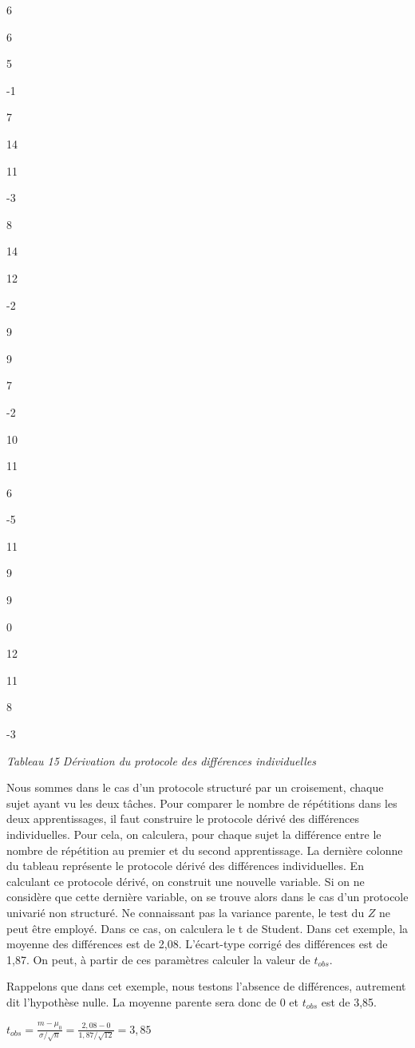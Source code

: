 \documentclass[]{book}
\theoremstyle{definition}
\theoremstyle{definition}
\theoremstyle{definition}
\theoremstyle{remark}
\begin{document}
6

6

5

-1

7

14

11

-3

8

14

12

-2

9

9

7

-2

10

11

6

-5

11

9

9

0

12

11

8

-3

\emph{Tableau 15 Dérivation du protocole des différences individuelles}

Nous sommes dans le cas d'un protocole structuré par un croisement,
chaque sujet ayant vu les deux tâches. Pour comparer le nombre de
répétitions dans les deux apprentissages, il faut construire le
protocole dérivé des différences individuelles. Pour cela, on calculera,
pour chaque sujet la différence entre le nombre de répétition au premier
et du second apprentissage. La dernière colonne du tableau représente le
protocole dérivé des différences individuelles. En calculant ce
protocole dérivé, on construit une nouvelle variable. Si on ne considère
que cette dernière variable, on se trouve alors dans le cas d'un
protocole univarié non structuré. Ne connaissant pas la variance
parente, le test du \(Z\) ne peut être employé. Dans ce cas, on
calculera le t de Student. Dans cet exemple, la moyenne des différences
est de 2,08. L'écart-type corrigé des différences est de 1,87. On peut,
à partir de ces paramètres calculer la valeur de \(t_{obs}\).

Rappelons que dans cet exemple, nous testons l'absence de différences,
autrement dit l'hypothèse nulle. La moyenne parente sera donc de 0 et
\(t_{obs}\) est de 3,85.

\(t_{obs} = \frac{m-\mu _{0}}{\sigma/\sqrt{n}} = \frac{2,08-0}{1,87/\sqrt{12}} = 3,85\)
\end{document}
